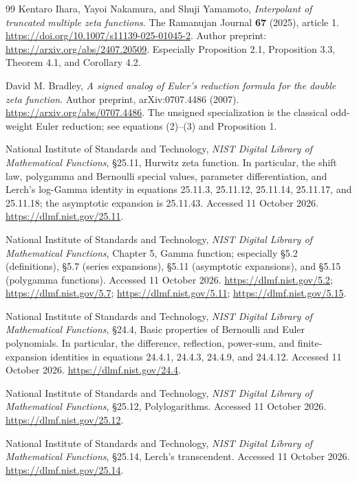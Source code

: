 \documentclass[11pt,letterpaper]{article}
\numberwithin{equation}{section}
\theoremstyle{plain}
\theoremstyle{definition}
\theoremstyle{remark}
\begin{document}
\begin{thebibliography}{99}
Kentaro Ihara, Yayoi Nakamura, and Shuji Yamamoto,
\emph{Interpolant of truncated multiple zeta functions}.
The Ramanujan Journal \textbf{67} (2025), article 1.
\url{https://doi.org/10.1007/s11139-025-01045-2}.
Author preprint: \url{https://arxiv.org/abs/2407.20509}.
Especially Proposition 2.1, Proposition 3.3, Theorem 4.1,
and Corollary 4.2.

David M. Bradley,
\emph{A signed analog of Euler's reduction formula for the double zeta
function}.
Author preprint, arXiv:0707.4486 (2007).
\url{https://arxiv.org/abs/0707.4486}.
The unsigned specialization is the classical odd-weight Euler reduction;
see equations (2)--(3) and Proposition 1.

National Institute of Standards and Technology,
\emph{NIST Digital Library of Mathematical Functions},
\S25.11, Hurwitz zeta function.
In particular, the shift law, polygamma and Bernoulli special values, parameter
differentiation, and Lerch's log-Gamma identity in
equations 25.11.3, 25.11.12, 25.11.14, 25.11.17, and 25.11.18;
the asymptotic expansion is 25.11.43.
Accessed 11 October 2026.
\url{https://dlmf.nist.gov/25.11}.

National Institute of Standards and Technology,
\emph{NIST Digital Library of Mathematical Functions},
Chapter 5, Gamma function; especially \S5.2 (definitions),
\S5.7 (series expansions), \S5.11 (asymptotic expansions),
and \S5.15 (polygamma functions).
Accessed 11 October 2026.
\url{https://dlmf.nist.gov/5.2};
\url{https://dlmf.nist.gov/5.7};
\url{https://dlmf.nist.gov/5.11};
\url{https://dlmf.nist.gov/5.15}.

National Institute of Standards and Technology,
\emph{NIST Digital Library of Mathematical Functions},
\S24.4, Basic properties of Bernoulli and Euler polynomials.
In particular, the difference, reflection, power-sum, and finite-expansion
identities in equations 24.4.1, 24.4.3, 24.4.9, and 24.4.12.
Accessed 11 October 2026.
\url{https://dlmf.nist.gov/24.4}.

National Institute of Standards and Technology,
\emph{NIST Digital Library of Mathematical Functions},
\S25.12, Polylogarithms.
Accessed 11 October 2026.
\url{https://dlmf.nist.gov/25.12}.

National Institute of Standards and Technology,
\emph{NIST Digital Library of Mathematical Functions},
\S25.14, Lerch's transcendent.
Accessed 11 October 2026.
\url{https://dlmf.nist.gov/25.14}.


\end{thebibliography}
\end{document}
